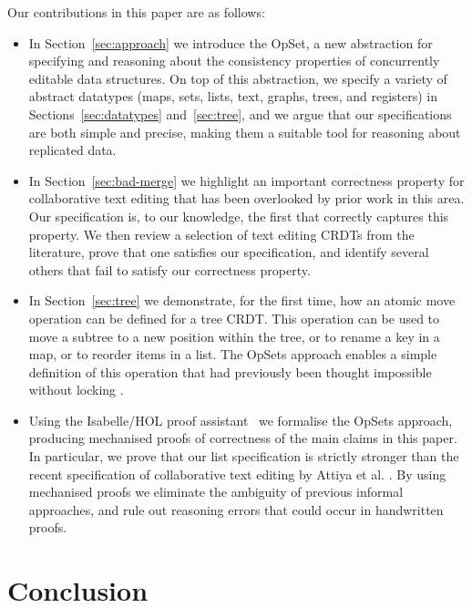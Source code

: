 \documentclass[11pt]{article}
\begin{document}
Our contributions in this paper are as follows:

\begin{itemize}
\item In Section~\ref{sec:approach} we introduce the OpSet, a new abstraction for specifying and reasoning about the consistency properties of concurrently editable data structures.
On top of this abstraction, we specify a variety of abstract datatypes (maps, sets, lists, text, graphs, trees, and registers) in Sections~\ref{sec:datatypes} and~\ref{sec:tree}, and we argue that our specifications are both simple and precise, making them a suitable tool for reasoning about replicated data.

\item In Section~\ref{sec:bad-merge} we highlight an important correctness property for collaborative text editing that has been overlooked by prior work in this area.
Our specification is, to our knowledge, the first that correctly captures this property.
We then review a selection of text editing CRDTs from the literature, prove that one satisfies our specification, and identify several others that fail to satisfy our correctness property.

\item In Section~\ref{sec:tree} we demonstrate, for the first time, how an atomic move operation can be defined for a tree CRDT.
This operation can be used to move a subtree to a new position within the tree, or to rename a key in a map, or to reorder items in a list.
The OpSets approach enables a simple definition of this operation that had previously been thought impossible without locking \cite{Najafzadeh:2017vk}.

\item Using the Isabelle/HOL proof assistant~\cite{DBLP:conf/tphol/WenzelPN08} we formalise the OpSets approach, producing mechanised proofs of correctness of the main claims in this paper.
In particular, we prove that our list specification is strictly stronger than the recent specification of collaborative text editing by Attiya et al. \cite{Attiya:2016kh}.
By using mechanised proofs we eliminate the ambiguity of previous informal approaches, and rule out reasoning errors that could occur in handwritten proofs.
\end{itemize}







\section{Conclusion}
\end{document}

